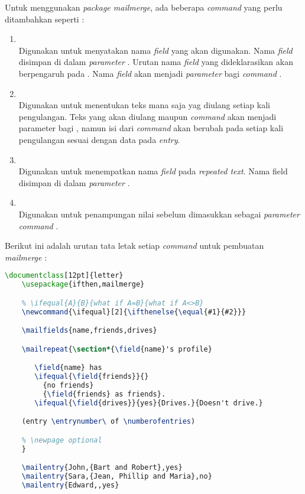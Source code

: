Untuk menggunakan \textit{package mailmerge}, ada beberapa \textit{command} yang perlu ditambahkan seperti \cite{Frasson:2009} :
\begin{enumerate}
	\item \texttt{\string\mailfields}\\
	Digunakan untuk menyatakan nama \textit{field} yang akan digunakan. Nama \textit{field} disimpan di dalam \textit{parameter} \texttt{\string\mailfields}. Urutan nama \textit{field} yang dideklarasikan akan berpengaruh pada \texttt{\string\mailentry}. Nama \textit{field} akan menjadi \textit{parameter} bagi \textit{command} \texttt{\string\field}.
	\item \texttt{\string\mailrepeat}\\
	Digunakan untuk menentukan teks mana saja yag diulang setiap kali pengulangan. Teks yang akan diulang maupun \textit{command} \texttt{\string\field} akan menjadi parameter bagi \texttt{\string\mailrepeat}, namun isi dari \textit{command} \texttt{\string\field} akan berubah pada setiap kali pengulangan sesuai dengan data pada \textit{entry}.
	\item \texttt{\string\field}\\
	Digunakan untuk menempatkan nama \textit{field} pada \textit{repeated text}. Nama field disimpan di dalam \textit{parameter} \texttt{\string\field}.
	\item \texttt{\string\mailentry}\\
	Digunakan untuk penampungan nilai sebelum dimasukkan sebagai \textit{parameter} \textit{command} \texttt{\string\field}.
\end{enumerate}
	Berikut ini adalah urutan tata letak setiap \textit{command} untuk pembuatan \textit{mailmerge} :
	\begin{lstlisting}[language=tex,basicstyle=\tiny,caption=Contoh pembuatan \textit{mailmerge}]
	\documentclass[12pt]{letter}
    \usepackage{ifthen,mailmerge}

    % \ifequal{A}{B}{what if A=B}{what if A<>B}
    \newcommand{\ifequal}[2]{\ifthenelse{\equal{#1}{#2}}}

    \mailfields{name,friends,drives}

    \mailrepeat{\section*{\field{name}'s profile}

       \field{name} has
       \ifequal{\field{friends}}{}
         {no friends}
         {\field{friends} as friends}.
       \ifequal{\field{drives}}{yes}{Drives.}{Doesn't drive.}

    (entry \entrynumber\ of \numberofentries)

    % \newpage optional
    }

    \mailentry{John,{Bart and Robert},yes}
    \mailentry{Sara,{Jean, Phillip and Maria},no}
    \mailentry{Edward,,yes}
 \end{lstlisting}
 
